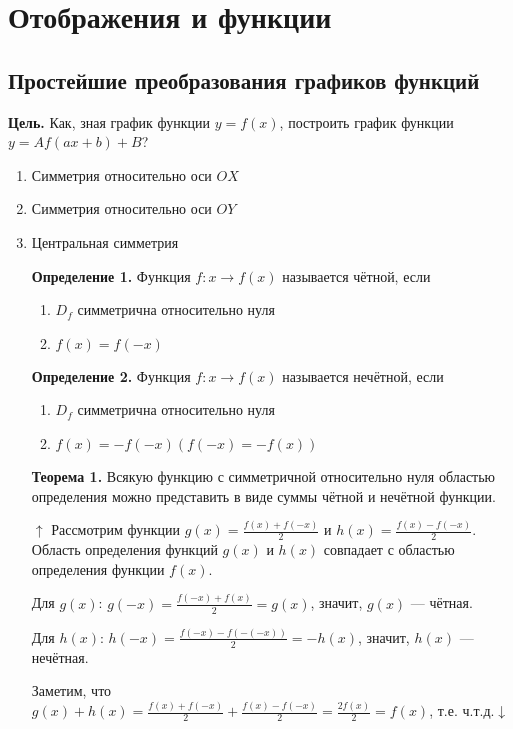 \documentclass{article}
\begin{document}
    \section{Отображения и функции}

    \subsection{Простейшие преобразования графиков функций}

    \textbf{Цель.} Как, зная график функции \(y=f(x)\), построить график функции \(y=Af(ax+b)+B\)?

    \begin{enumerate}
        \item Симметрия относительно оси \(OX\)
        \item Симметрия относительно оси \(OY\)
        \item Центральная симметрия

        \textbf{Определение 1.} Функция \(f: x \rightarrow f(x)\) называется чётной, если
        \begin{enumerate}
            \item \(D_f\) симметрична относительно нуля
            \item \(f(x)=f(-x)\)
        \end{enumerate}

        \textbf{Определение 2.} Функция \(f: x \rightarrow f(x)\) называется нечётной, если
        \begin{enumerate}
            \item \(D_f\) симметрична относительно нуля
            \item \(f(x)=-f(-x)(f(-x)=-f(x))\)
        \end{enumerate}

        \textbf{Теорема 1.} Всякую функцию с симметричной относительно нуля областью определения можно представить в виде суммы чётной и нечётной функции.

        \(\uparrow\) Рассмотрим функции \(g(x)=\frac{f(x)+f(-x)}{2}\) и \(h(x)=\frac{f(x)-f(-x)}{2}\).
        Область определения функций \(g(x)\) и \(h(x)\) совпадает с областью определения функции \(f(x)\).

        Для \(g(x)\): \(g(-x)=\frac{f(-x)+f(x)}{2}=g(x)\), значит, \(g(x)\) --- чётная.

        Для \(h(x)\): \(h(-x)=\frac{f(-x)-f(-(-x))}{2}=-h(x)\), значит, \(h(x)\) --- нечётная.

        Заметим, что \(g(x)+h(x)=\frac{f(x)+f(-x)}{2}+\frac{f(x)-f(-x)}{2}=\frac{2f(x)}{2}=f(x)\), т.е. ч.т.д.\(\downarrow\)


\end{enumerate}
\end{document}
